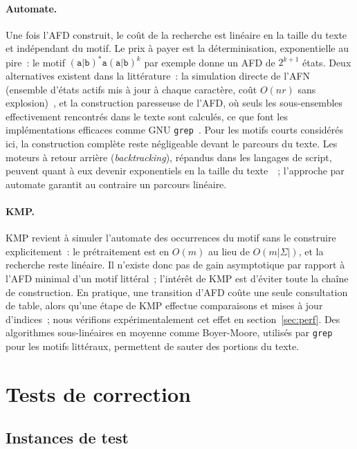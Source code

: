 \documentclass[11pt,a4paper]{article}
\begin{document}
\paragraph{Automate.} Une fois l'AFD construit, le coût de la recherche est
linéaire en la taille du texte et indépendant du motif. Le prix à payer est la
déterminisation, exponentielle au pire~: le motif
$(\texttt{a|b})^*\texttt{a}(\texttt{a|b})^{k}$ par exemple donne un AFD de
$2^{k+1}$ états. Deux alternatives existent dans la littérature~:
la simulation directe de l'AFN (ensemble d'états actifs mis à jour à chaque
caractère, coût $O(nr)$ sans explosion)~\cite{Thompson1968,Cox2007}, et la
construction paresseuse de l'AFD, où seuls les sous-ensembles effectivement
rencontrés dans le texte sont calculés, ce que font les implémentations
efficaces comme GNU \texttt{grep}~\cite{Cox2007}. Pour les motifs courts
considérés ici, la construction complète reste négligeable devant le parcours
du texte. Les moteurs à retour arrière (\emph{backtracking}), répandus dans les
langages de script, peuvent quant à eux devenir exponentiels en la taille du
texte~\cite{Cox2007}~; l'approche par automate garantit au contraire un
parcours linéaire.

\paragraph{KMP.} KMP revient à simuler l'automate des occurrences du motif
sans le construire explicitement~: le prétraitement est en $O(m)$ au lieu de
$O(m|\Sigma|)$, et la recherche reste linéaire. Il n'existe donc pas de gain
asymptotique par rapport à l'AFD minimal d'un motif littéral~; l'intérêt de
KMP est d'éviter toute la chaîne de construction. En pratique, une
transition d'AFD coûte une seule consultation de table, alors qu'une étape de
KMP effectue comparaisons et mises à jour d'indices~; nous vérifions
expérimentalement cet effet en section~\ref{sec:perf}. Des algorithmes
sous-linéaires en moyenne comme Boyer-Moore, utilisés par \texttt{grep} pour
les motifs littéraux, permettent de sauter des portions du texte.

\section{Tests de correction}
\label{sec:tests}

\subsection{Instances de test}
\end{document}
